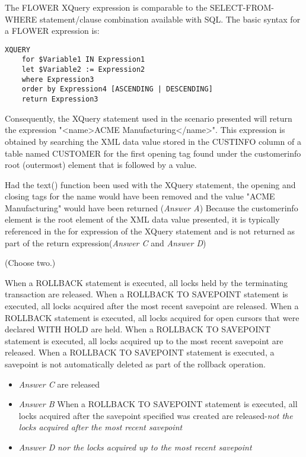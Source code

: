 \documentclass[answers, 11pt]{exam}
\begin{document}
\begin{questions}
\begin{solution}
The FLOWER XQuery expression is comparable to the SELECT-FROM-WHERE statement/clause combination available
with SQL. The basic syntax for a FLOWER expression is:
\begin{verbatim}
XQUERY
	for $Variable1 IN Expression1
	let $Variable2 := Expression2
	where Expression3
	order by Expression4 [ASCENDING | DESCENDING]
	return Expression3
\end{verbatim}
Consequently, the XQuery statement used in the scenario presented will return the expression 
"<name>ACME Manufacturing</name>". This expression is obtained by searching the XML data value
stored in the CUSTINFO column of a table named CUSTOMER for the first opening tag found under the 
customerinfo root (outermost) element that is followed by a value. 

Had the text() function been used with the XQuery statement, the opening and closing tags for the name 
would have been removed and the value "ACME Manufacturing" would have been returned (\textit{Answer A})
Because the customerinfo element is the root element of the XML data value presented, it is typically
referenced in the for expression of the XQuery statement and is not returned as part of the return
expression(\textit{Answer C} and \textit{Answer D})
\end{solution}

(Choose two.)
\begin{choices}
\CorrectChoice When a ROLLBACK statement is executed, all locks held by the terminating transaction are released.
\choice When a ROLLBACK TO SAVEPOINT statement is executed, all locks acquired after the most recent
savepoint are released.
\choice When a ROLLBACK statement is executed, all locks acquired for open cursors that were 
declared WITH HOLD are held.
\choice When a ROLLBACK TO SAVEPOINT statement is executed, all locks acquired up to the most recent
savepoint are released.
\CorrectChoice When a ROLLBACK TO SAVEPOINT statement is executed, a savepoint is not automatically deleted as
part of the rollback operation.
\end{choices}

\begin{solution}
\begin{itemize}
\item \textit{Answer C} are released
\item \textit{Answer B} When a ROLLBACK TO SAVEPOINT statement is executed, all locks acquired after the
savepoint specified was created are released-\textit{not the locks acquired after the most recent 
savepoint}
\item \textit{Answer D} \textit{nor the locks acquired up to the most recent savepoint}
\end{itemize}
\end{solution}


\end{questions}
\end{document}
